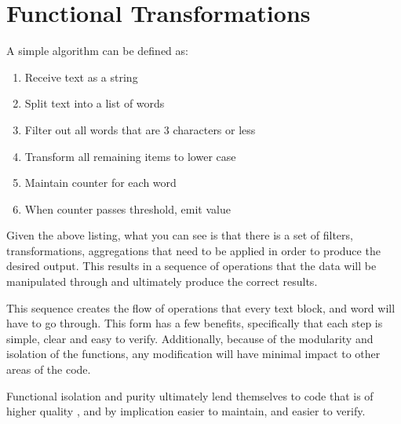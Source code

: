 \chapter{Functional Transformations}

A simple algorithm can be defined as:

\begin{enumerate}
  \item Receive text as a string
  \item Split text into a list of words
  \item Filter out all words that are 3 characters or less
  \item Transform all remaining items to lower case
  \item Maintain counter for each word 
  \item When counter passes threshold, emit value
\end{enumerate}

Given the above listing, what you can see is that there is a set of filters, transformations, aggregations that need to be applied in order to produce the desired output.  This results in a sequence of operations that the data will be manipulated through and ultimately produce the correct results.

This sequence creates the flow of operations that every text block, and word will have to go through.  This form has a few benefits, specifically that each step is simple, clear and easy to verify.  Additionally, because of the modularity and isolation of the functions, any modification will have minimal impact to other areas of the code.

Functional isolation and purity ultimately lend themselves to code that is of higher quality \cite{langstudy14}, and by implication easier to maintain, and easier to verify.


